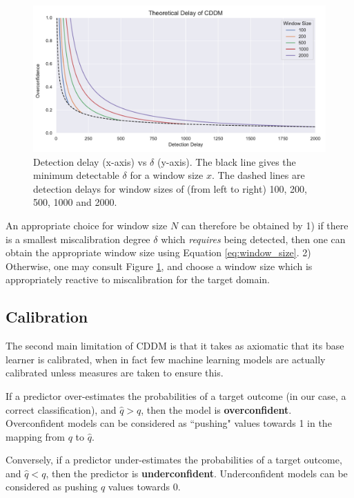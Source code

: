 \begin{figure}
    \centering
    \includegraphics[width=\textwidth]{images/cddm_window_size.pdf}
    \caption{Detection delay (x-axis) vs $\delta$ (y-axis). The black line gives the minimum detectable $\delta$ for a window size $x$. The dashed lines are detection delays for window sizes of (from left to right) 100, 200, 500, 1000 and 2000.}
    \label{fig:cddm_window_size}
\end{figure}

An appropriate choice for window size $N$ can therefore be obtained by 1) if there is a smallest miscalibration degree $\delta$ which {\it requires} being detected, then one can obtain the appropriate window size using Equation \ref{eq:window_size}. 2) Otherwise, one may consult Figure \ref{fig:cddm_window_size}, and choose a window size which is appropriately reactive to miscalibration for the target domain.


\subsection{Calibration}

The second main limitation of CDDM is that it takes as axiomatic that its base learner is calibrated, when in fact few machine learning models are actually calibrated unless measures are taken to ensure this.



\cite{nn_calibration}
\cite{trust_model_uncertainty}

If a predictor over-estimates the probabilities of a target outcome (in our case, a correct classification), and $\hat{q}>q$, then the model is {\bf overconfident}. Overconfident models can be considered as ``pushing" values towards 1 in the mapping from $q$ to $\hat{q}$.
\item Conversely, if a predictor under-estimates the probabilities of a target outcome, and $\hat{q}<q$, then the predictor is {\bf underconfident}. Underconfident models can be considered as pushing $q$ values towards 0.

